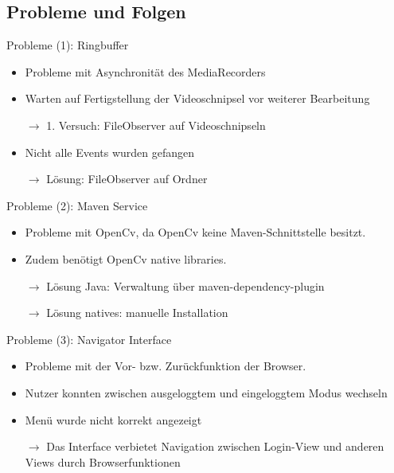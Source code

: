 \documentclass[19pt]{beamer}
\begin{document}
\subsection{Probleme und Folgen}
\begin{frame}{Probleme (1): Ringbuffer}
	\begin{itemize}
		\item Probleme mit Asynchronität des MediaRecorders
		\pause
		\item Warten auf Fertigstellung der Videoschnipsel vor weiterer Bearbeitung
		\pause
		\item[$\rightarrow$] 1. Versuch: FileObserver auf Videoschnipseln
		\pause
		\item Nicht alle Events wurden gefangen
		\pause
		\item[$\rightarrow$] Lösung: FileObserver auf Ordner
	\end{itemize}
\end{frame}

\begin{frame}{Probleme (2): Maven Service}
	\begin{itemize}
		\item Probleme mit OpenCv, da OpenCv keine Maven-Schnittstelle besitzt.
		\pause
		\item Zudem benötigt OpenCv native libraries.
		\pause
		\item[$\rightarrow$] Lösung Java: Verwaltung über maven-dependency-plugin
		\pause
		\item[$\rightarrow$] Lösung natives: manuelle Installation
	\end{itemize}
\end{frame}

\begin{frame}{Probleme (3): Navigator Interface}
	\begin{itemize}
		\item Probleme mit der Vor- bzw. Zurückfunktion der Browser.
		\pause
		\item Nutzer konnten zwischen ausgeloggtem und eingeloggtem Modus wechseln
		\pause
		\item Menü wurde nicht korrekt angezeigt
		\pause
		\item[$\rightarrow$] Das Interface verbietet Navigation zwischen Login-View und anderen Views durch Browserfunktionen
	\end{itemize}
\end{frame}
\end{document}
